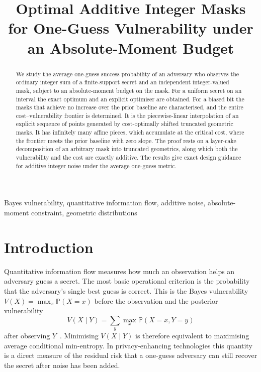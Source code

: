 \documentclass[conference]{IEEEtran}
\newcommand{\Prob}{\mathbb{P}}
\begin{document}
\title{Optimal Additive Integer Masks for One-Guess Vulnerability under an Absolute-Moment Budget}

\author{
}

\maketitle

\begin{abstract}
We study the average one-guess success probability of an adversary who observes the ordinary integer sum of a finite-support secret and an independent integer-valued mask, subject to an absolute-moment budget on the mask. For a uniform secret on an interval the exact optimum and an explicit optimiser are obtained. For a biased bit the masks that achieve no increase over the prior baseline are characterised, and the entire cost--vulnerability frontier is determined. It is the piecewise-linear interpolation of an explicit sequence of points generated by cost-optimally shifted truncated geometric masks. It has infinitely many affine pieces, which accumulate at the critical cost, where the frontier meets the prior baseline with zero slope. The proof rests on a layer-cake decomposition of an arbitrary mask into truncated geometrics, along which both the vulnerability and the cost are exactly additive. The results give exact design guidance for additive integer noise under the average one-guess metric.
\end{abstract}

\begin{IEEEkeywords}
Bayes vulnerability, quantitative information flow, additive noise, absolute-moment constraint, geometric distributions
\end{IEEEkeywords}

\section{Introduction}
Quantitative information flow measures how much an observation helps an adversary guess a secret. The most basic operational criterion is the probability that the adversary's single best guess is correct. This is the Bayes vulnerability \(V(X)=\max_x\Prob(X=x)\) before the observation and the posterior vulnerability
\[
V(X\mid Y)=\sum_y\max_x\Prob(X=x,Y=y)
\]
after observing \(Y\)~\cite{Smith09}. Minimising \(V(X\mid Y)\) is therefore equivalent to maximising average conditional min-entropy. In privacy-enhancing technologies this quantity is a direct measure of the residual risk that a one-guess adversary can still recover the secret after noise has been added.
\end{document}
